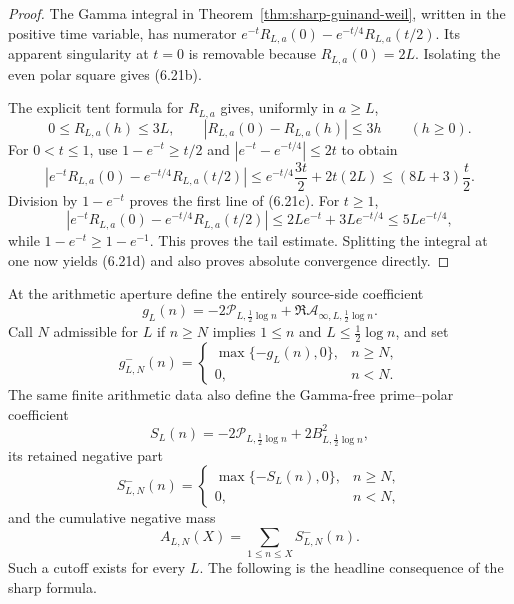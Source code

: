 \documentclass[11pt]{article}
\begin{document}
\begin{proof}
The Gamma integral in Theorem~\ref{thm:sharp-guinand-weil}, written in the positive time
variable, has numerator
$e^{-t}R_{L,a}(0)-e^{-t/4}R_{L,a}(t/2)$.  Its apparent singularity at $t=0$ is removable because
$R_{L,a}(0)=2L$.  Isolating the even polar square gives \textup{(6.21b)}.

The explicit tent formula for $R_{L,a}$ gives, uniformly in $a\ge L$,
\[
 0\le R_{L,a}(h)\le3L,
 \qquad
 |R_{L,a}(0)-R_{L,a}(h)|\le3h
 \qquad(h\ge0).
\]
For $0<t\le1$, use
$1-e^{-t}\ge t/2$ and $|e^{-t}-e^{-t/4}|\le2t$ to obtain
\[
 \left|e^{-t}R_{L,a}(0)-e^{-t/4}R_{L,a}(t/2)\right|
 \le e^{-t/4}\frac{3t}{2}+2t(2L)
 \le(8L+3)\frac t2.
\]
Division by $1-e^{-t}$ proves the first line of \textup{(6.21c)}.  For $t\ge1$,
\[
 \left|e^{-t}R_{L,a}(0)-e^{-t/4}R_{L,a}(t/2)\right|
 \le2Le^{-t}+3Le^{-t/4}
 \le5Le^{-t/4},
\]
while $1-e^{-t}\ge1-e^{-1}$.  This proves the tail estimate.  Splitting the integral at one
now yields \textup{(6.21d)} and also proves absolute convergence directly.
\end{proof}

At the arithmetic aperture define the entirely source-side coefficient
\[
 g_L(n)=-2\mathcal P_{L,\frac12\log n}
       +\Re\mathcal A_{\infty,L,\frac12\log n}.
 \tag{6.22}
\]
Call $N$ admissible for $L$ if $n\ge N$ implies
$1\le n$ and $L\le\frac12\log n$, and set
\[
 g_{L,N}^-(n)=
 \begin{cases}
  \max\{-g_L(n),0\},&n\ge N,\\
  0,&n<N.
 \end{cases}
 \tag{6.23}
\]
The same finite arithmetic data also define the Gamma-free prime--polar coefficient
\[
 S_L(n)=-2\mathcal P_{L,\frac12\log n}
        +2B_{L,\frac12\log n}^{2},
 \tag{6.23a}
\]
its retained negative part
\[
 S_{L,N}^-(n)=
 \begin{cases}
  \max\{-S_L(n),0\},&n\ge N,\\
  0,&n<N,
 \end{cases}
 \tag{6.23b}
\]
and the cumulative negative mass
\[
 A_{L,N}(X)=\sum_{1\le n\le X}S_{L,N}^-(n).
 \tag{6.23c}
\]
Such a cutoff exists for every $L$.  The following is the headline consequence of the sharp
formula.
\end{document}
